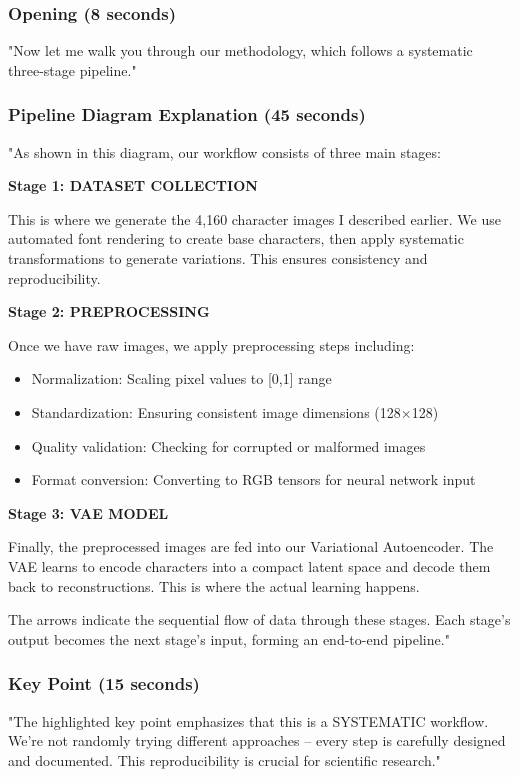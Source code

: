 \documentclass[11pt,a4paper]{article}
\begin{document}
\subsubsection*{Opening (8 seconds)}
\begin{scriptbox}
"Now let me walk you through our methodology, which follows a systematic three-stage pipeline."
\end{scriptbox}

\subsubsection*{Pipeline Diagram Explanation (45 seconds)}
\begin{scriptbox}
"As shown in this diagram, our workflow consists of three main stages:

\textbf{Stage 1: DATASET COLLECTION}

This is where we generate the 4,160 character images I described earlier. We use automated font rendering to create base characters, then apply systematic transformations to generate variations. This ensures consistency and reproducibility.

\textbf{Stage 2: PREPROCESSING}

Once we have raw images, we apply preprocessing steps including:
\begin{itemize}
\item Normalization: Scaling pixel values to [0,1] range
\item Standardization: Ensuring consistent image dimensions (128×128)
\item Quality validation: Checking for corrupted or malformed images
\item Format conversion: Converting to RGB tensors for neural network input
\end{itemize}

\textbf{Stage 3: VAE MODEL}

Finally, the preprocessed images are fed into our Variational Autoencoder. The VAE learns to encode characters into a compact latent space and decode them back to reconstructions. This is where the actual learning happens.

The arrows indicate the sequential flow of data through these stages. Each stage's output becomes the next stage's input, forming an end-to-end pipeline."
\end{scriptbox}

\subsubsection*{Key Point (15 seconds)}
\begin{scriptbox}
"The highlighted key point emphasizes that this is a SYSTEMATIC workflow. We're not randomly trying different approaches -- every step is carefully designed and documented. This reproducibility is crucial for scientific research."
\end{scriptbox}
\end{document}
